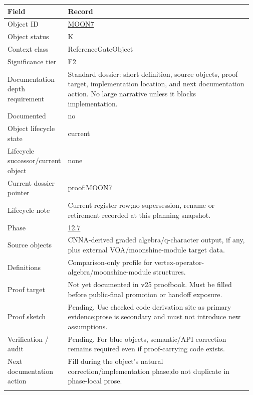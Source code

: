 \begin{longtable}{L{0.16\linewidth} L{0.81\linewidth}}
\hline
\textbf{Field} & \textbf{Record}\\
\hline
Object ID & \hyperlink{object-row-MOON7}{MOON7}\\
\hline\addlinespace[0.20em]
Object status & K\\
\hline\addlinespace[0.20em]
Context class & ReferenceGateObject\\
\hline\addlinespace[0.20em]
Significance tier & F2\\
\hline\addlinespace[0.20em]
Documentation depth requirement & Standard dossier: short definition, source objects, proof target, implementation location, and next documentation action. No large narrative unless it blocks implementation.\\
\hline\addlinespace[0.20em]
Documented & no\\
\hline\addlinespace[0.20em]
Object lifecycle state & current\\
\hline\addlinespace[0.20em]
Lifecycle successor/\allowbreak{}current object & none\\
\hline\addlinespace[0.20em]
Current dossier pointer & proof:MOON7\\
\hline\addlinespace[0.20em]
Lifecycle note & Current register row;\newline no supersession, rename or retirement recorded at this planning snapshot.\\
\hline\addlinespace[0.20em]
Phase & \hyperlink{phase-row-12-7}{12.7}\\
\hline\addlinespace[0.20em]
Source objects & CNNA-derived graded algebra/\allowbreak{}q-character output, if any, plus external VOA/\allowbreak{}moonshine-module target data.\\
\hline\addlinespace[0.20em]
Definitions & Comparison-only profile for vertex-operator-algebra/\allowbreak{}moonshine-module structures.\\
\hline\addlinespace[0.20em]
Proof target & Not yet documented in v25 proofbook. Must be filled before public-final promotion or handoff exposure.\\
\hline\addlinespace[0.20em]
Proof sketch & Pending. Use checked code derivation site as primary evidence;\newline prose is secondary and must not introduce new assumptions.\\
\hline\addlinespace[0.20em]
Verification /\allowbreak{} audit & Pending. For blue objects, semantic/\allowbreak{}API correction remains required even if proof-carrying code exists.\\
\hline\addlinespace[0.20em]
Next documentation action & Fill during the object's natural correction/\allowbreak{}implementation phase;\newline do not duplicate in phase-local prose.\\
\hline\addlinespace[0.20em]
\end{longtable}
